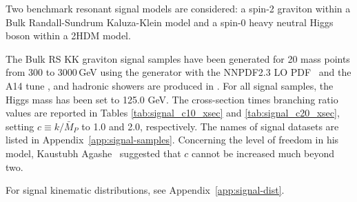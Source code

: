 Two benchmark resonant signal models are considered: a spin-2 graviton within a Bulk Randall-Sundrum Kaluza-Klein model and a spin-0 heavy neutral Higgs boson within a 2HDM model. 

The Bulk RS KK graviton signal samples have been generated for 20 mass points from 300 to 3000\,GeV using the \Madgraph generator\cite{MG5aMCatNLO} with the NNPDF2.3 LO PDF~\cite{Ball:2012cx} and the A14 tune \cite{ATL-PHYS-PUB-2014-021}, and hadronic showers are produced in .  For all signal samples, the Higgs mass has been set to 125.0 GeV. The cross-section times branching ratio values are reported in Tables \ref{tab:signal_c10_xsec} and \ref{tab:signal_c20_xsec}, setting $c \equiv k/\bar{M}_P$ to 1.0 and 2.0, respectively.  The names of signal datasets are listed in Appendix~\ref{app:signal-samples}. Concerning the level of freedom in his model, Kaustubh Agashe~\cite{Agashe} suggested that $c$ cannot be increased much beyond two.

For signal kinematic distributions, see Appendix~\ref{app:signal-dist}.

